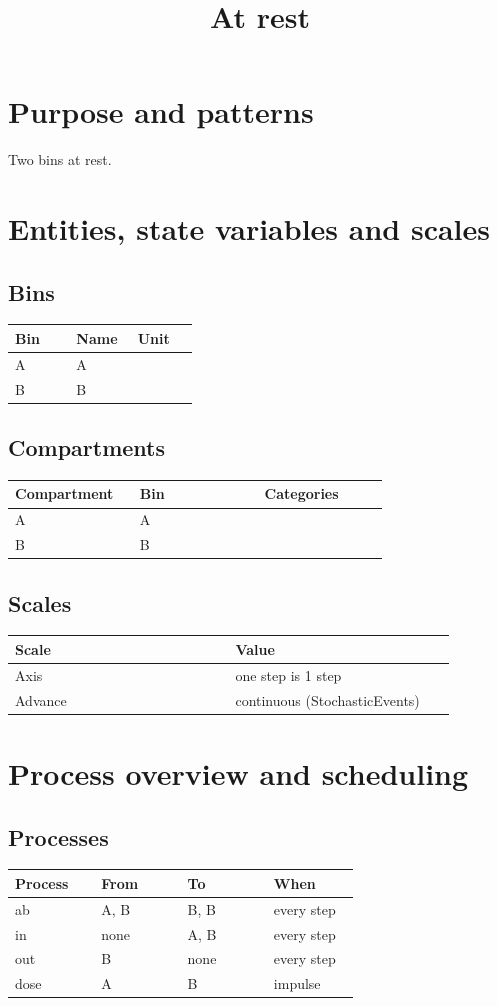 \documentclass{article}
\title{At rest}
\date{}
\begin{document}
\maketitle
\section*{Purpose and patterns}
Two bins at rest.

\section*{Entities, state variables and scales}
\subsection*{Bins}
\begin{longtable}{p{0.3\linewidth}p{0.3\linewidth}p{0.3\linewidth}}
Bin & Name & Unit \\
\hline
\endhead
A & A &  \\
B & B &  \\
\end{longtable}
\subsection*{Compartments}
\begin{longtable}{p{0.3\linewidth}p{0.3\linewidth}p{0.3\linewidth}}
Compartment & Bin & Categories \\
\hline
\endhead
A & A &  \\
B & B &  \\
\end{longtable}
\subsection*{Scales}
\begin{longtable}{p{0.45\linewidth}p{0.45\linewidth}}
Scale & Value \\
\hline
\endhead
Axis & one step is 1 step \\
Advance & continuous (StochasticEvents) \\
\end{longtable}
\section*{Process overview and scheduling}
\subsection*{Processes}
\begin{longtable}{p{0.225\linewidth}p{0.225\linewidth}p{0.225\linewidth}p{0.225\linewidth}}
Process & From & To & When \\
\hline
\endhead
ab & A, B & B, B & every step \\
in & none & A, B & every step \\
out & B & none & every step \\
dose & A & B & impulse \\
\end{longtable}
\end{document}
